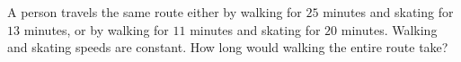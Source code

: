 A person travels the same route either by walking for $25$ minutes and skating for $13$ minutes, or by walking for $11$ minutes and skating for $20$ minutes. Walking and skating speeds are constant. How long would walking the entire route take?
